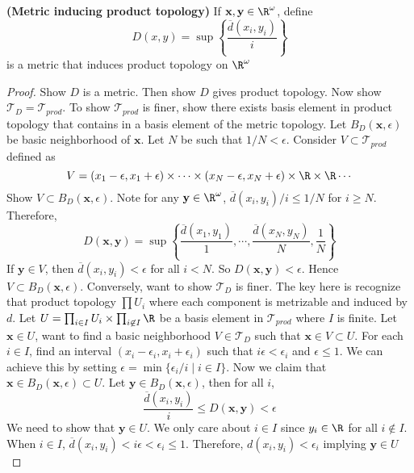 \documentclass[10.5pt]{article}
\newcommand{\calT}{\mathcal{T}}
\newcommand{\bx}{\mathbf{x}}
\newcommand{\by}{\mathbf{y}}
\begin{document}
\begin{theorem*}
    \textbf{(Metric inducing product topology)} If $\bx, \by \in \R^{\omega}$, define
    \[
        D(x,y) = \sup \left\{
            \frac{\overline{d}(x_i, y_i)}{i}
        \right\}   
    \]
    is a metric that induces product topology on $\R^{\omega}$
    \begin{proof}
        Show $D$ is a metric. Then show $D$ gives product topology. Now show $\calT_D = \calT_{prod}$. To show $\calT_{prod}$ is finer, show there exists basis element in product topology that contains in a basis element of the metric topology. Let $B_D(\bx, \epsilon)$ be basic neighborhood of $\bx$. Let $N$ be such that $1/N < \epsilon$. Consider $V\subset \calT_{prod}$ defined as
        \[
            V = (x_1 - \epsilon, x_1 + \epsilon) \times \cdots \times (x_N - \epsilon, x_N + \epsilon) \times \R \times \R \cdots
        \]
        Show $V\subset B_D(\bx, \epsilon)$. Note for any $\by \in \R^{\omega}$, $\overline{d}(x_i, y_i) / i \leq 1/N$ for $i\geq N$. Therefore, 
        \[
            D(\bx, \by) = \sup \left\{
                \frac{\overline{d}(x_1, y_1)}{1}, \cdots, \frac{\overline{d}(x_N, y_N)}{N}, \frac{1}{N}
            \right\}    
        \]
        If $\by \in V$, then $\overline{d}(x_i, y_i) < \epsilon$ for all $i < N$. So $D(\bx, \by) < \epsilon$. Hence $V\subset B_D(\bx, \epsilon)$. Conversely, want to show $\calT_D$ is finer. The key here is recognize that product topology $\textstyle \prod U_i$ where each component is metrizable and induced by $d$. Let $U = \textstyle \prod_{i\in I} U_i \times \prod_{i\not\in I} \R$ be a basis element in $\calT_{prod}$ where $I$ is finite. Let $\bx \in U$, want to find a basic neighborhood $V \in \calT_{D}$ such that $\bx \in V \subset U$. For each $i\in I$, find an interval $(x_i - \epsilon_i, x_i + \epsilon_i)$ such that $i \epsilon < \epsilon_i$ and $\epsilon \leq 1$. We can achieve this by setting $\epsilon = \min \{\epsilon_i /i \mid i\in I\}$. Now we claim that $\bx \in B_D(\bx, \epsilon)\subset U$. Let $\by \in B_D(\bx, \epsilon)$, then for all $i$,
        \[
            \frac{\overline{d}(x_i, y_i)}{i} \leq D(\bx, \by) < \epsilon    
        \]
        We need to show that $\by \in U$. We only care about $i\in I$ since $y_i \in \R$ for all $i\not\in I$. When $i\in I$, $\overline{d}(x_i, y_i) < i \epsilon < \epsilon_i \leq 1$. Therefore, $d(x_i, y_i) < \epsilon_i$ implying $\by \in \textstyle U$
    \end{proof}
\end{theorem*}
\end{document}
